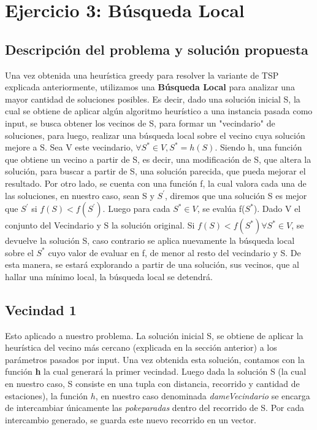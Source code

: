 \section{Ejercicio 3: Búsqueda Local}
    \subsection{Descripción del problema y solución propuesta}
    Una vez obtenida una heurística greedy para resolver la variante de TSP explicada anteriormente, utilizamos una \textbf{Búsqueda Local} para analizar una mayor cantidad de soluciones posibles. Es decir, dado una solución inicial S, la cual se obtiene de aplicar algún algoritmo heurístico a una instancia pasada como input, se busca obtener los vecinos de S, para formar un "vecindario" de soluciones, para luego, realizar una búsqueda local sobre el vecino cuya solución mejore a S. Sea V este vecindario, $\forall S^{*}\in V, S^{*} = h(S)$. Siendo h, una función que obtiene un vecino a partir de S, es decir, una modificación de S, que altera la solución, para buscar a partir de S, una solución parecida, que pueda mejorar el resultado. Por otro lado, se cuenta con una función f, la cual valora cada una de las soluciones, en nuestro caso, sean S y $S^{'}$, diremos que una solución S es mejor que $S^{'}$ si $f(S) < f(S^{'})$. Luego para cada $S^{*}\in V$, se evalúa f($S^{*}$). Dado V el conjunto del Vecindario y S la solución original. Si $f(S)<f(S^{*}) \forall S^{*}\in V$, se devuelve la solución S, caso contrario se aplica nuevamente la búsqueda local sobre el $S^{*}$ cuyo valor de evaluar en f, de menor al resto del vecindario y S. De esta manera, se estará explorando a partir de una solución, sus vecinos, que al hallar una mínimo local, la búsqueda local se detendrá.

    \subsection{Vecindad 1}

    \par Esto aplicado a nuestro problema. La solución inicial S, se obtiene de aplicar la heurística del vecino más cercano (explicada en la sección anterior) a los parámetros pasados por input. Una vez obtenida esta solución, contamos con la función \textbf{h} la cual generará la primer vecindad. Luego dada la solución S (la cual en nuestro caso, S consiste en una tupla con distancia, recorrido y cantidad de estaciones), la función $h$, en nuestro caso denominada \emph{dameVecindario} se encarga de intercambiar únicamente las \emph{pokeparadas} dentro del recorrido de S. Por cada intercambio generado, se guarda este nuevo recorrido en un vector.

